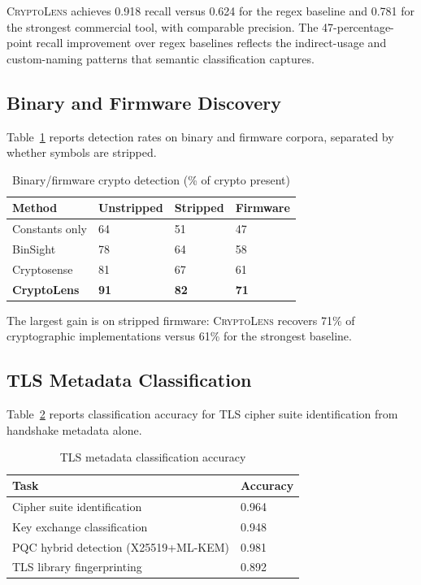 \documentclass[sigconf,nonacm]{acmart}
\begin{document}
\textsc{CryptoLens} achieves 0.918 recall versus 0.624 for the
regex baseline and 0.781 for the strongest commercial tool, with
comparable precision. The 47-percentage-point recall improvement over
regex baselines reflects the indirect-usage and custom-naming
patterns that semantic classification captures.

\subsection{Binary and Firmware Discovery}

Table~\ref{tab:binary} reports detection rates on binary and
firmware corpora, separated by whether symbols are stripped.

\begin{table}[h]
\caption{Binary/firmware crypto detection (\% of crypto present)}
\label{tab:binary}
\small
\begin{tabularx}{\columnwidth}{@{}p{2.6cm}X X X@{}}
\toprule
\textbf{Method} & \textbf{Unstripped} & \textbf{Stripped} & \textbf{Firmware} \\
\midrule
Constants only         & 64 & 51 & 47 \\
BinSight~\cite{caballero2023binsight}      & 78 & 64 & 58 \\
Cryptosense            & 81 & 67 & 61 \\
\textbf{CryptoLens}    & \textbf{91} & \textbf{82} & \textbf{71} \\
\bottomrule
\end{tabularx}
\end{table}

The largest gain is on stripped firmware: \textsc{CryptoLens}
recovers 71\% of cryptographic implementations versus 61\% for the
strongest baseline.

\subsection{TLS Metadata Classification}

Table~\ref{tab:tls} reports classification accuracy for TLS cipher
suite identification from handshake metadata alone.

\begin{table}[h]
\caption{TLS metadata classification accuracy}
\label{tab:tls}
\small
\begin{tabularx}{\columnwidth}{@{}p{3.0cm}X@{}}
\toprule
\textbf{Task} & \textbf{Accuracy} \\
\midrule
Cipher suite identification    & 0.964 \\
Key exchange classification    & 0.948 \\
PQC hybrid detection (X25519+ML-KEM) & 0.981 \\
TLS library fingerprinting     & 0.892 \\
\bottomrule
\end{tabularx}
\end{table}
\end{document}
